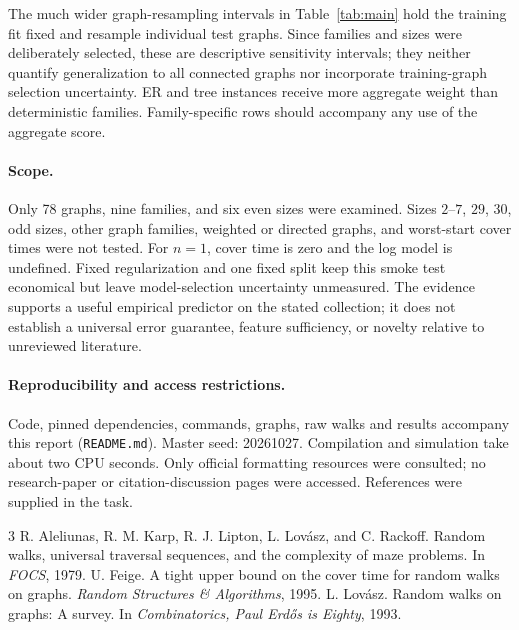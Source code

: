 \documentclass{article}
\begin{document}
The much wider graph-resampling intervals in Table~\ref{tab:main} hold the training fit fixed and resample individual test graphs. Since families and sizes were deliberately selected, these are descriptive sensitivity intervals; they neither quantify generalization to all connected graphs nor incorporate training-graph selection uncertainty. ER and tree instances receive more aggregate weight than deterministic families. Family-specific rows should accompany any use of the aggregate score.

\paragraph{Scope.}
Only 78 graphs, nine families, and six even sizes were examined. Sizes $2$--$7$, $29$, $30$, odd sizes, other graph families, weighted or directed graphs, and worst-start cover times were not tested. For $n=1$, cover time is zero and the log model is undefined. Fixed regularization and one fixed split keep this smoke test economical but leave model-selection uncertainty unmeasured. The evidence supports a useful empirical predictor on the stated collection; it does not establish a universal error guarantee, feature sufficiency, or novelty relative to unreviewed literature.

\paragraph{Reproducibility and access restrictions.}
Code, pinned dependencies, commands, graphs, raw walks and results accompany this report (\texttt{README.md}). Master seed: 20261027. Compilation and simulation take about two CPU seconds. Only official formatting resources were consulted; no research-paper or citation-discussion pages were accessed. References were supplied in the task.

\begin{thebibliography}{3}\small
{}
R. Aleliunas, R. M. Karp, R. J. Lipton, L. Lov\'asz, and C. Rackoff.
Random walks, universal traversal sequences, and the complexity of maze problems.
In \emph{FOCS}, 1979.
U. Feige. A tight upper bound on the cover time for random walks on graphs.
\emph{Random Structures \& Algorithms}, 1995.
L. Lov\'asz. Random walks on graphs: A survey.
In \emph{Combinatorics, Paul Erd\H{o}s is Eighty}, 1993.
\end{thebibliography}
\end{document}
